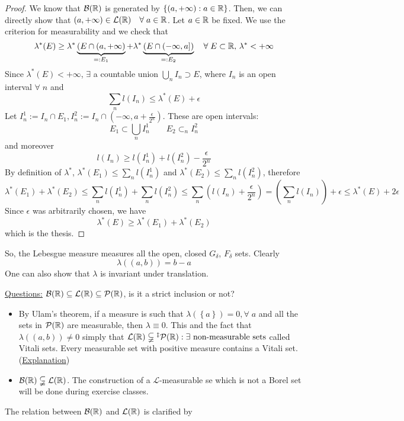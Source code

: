 \begin{proof}
    We know that \(\mathcal{B}(\mathbb{R})\) is generated by \(\left\lbrace (a, +\infty) : a \in \mathbb{R} \right\rbrace\). Then, we can directly show that \((a, +\infty) \in \mathcal{L}(\mathbb{R}) \quad \forall \; a \in \mathbb{R}\). Let \(a \in \mathbb{R}\) be fixed. We use the criterion for measurability and we check that 
    \[
        \lambda^* (E) \geq \lambda^*\underbrace{(E \cap (a, +\infty)}_{=: E_1} + \lambda^*\underbrace{(E \cap (-\infty, a])}_{=:E_2} \quad \forall\; E \subset \mathbb{R}, \, \lambda^* < +\infty
    \]
    Since \(\lambda^*(E) < +\infty\), \(\exists\) a countable union \(\bigcup_n I_n \supset E\), where \(I_n\) is an open interval \(\forall \; n\) and 
    \[
        \sum_n l(I_n) \leq \lambda^*(E) + \epsilon
    \]
    Let \(I^1_n := I_n \cap E_1, I^2_n := I_n \cap (-\infty, a + \frac{\epsilon}{2^n})\). These are open intervals:
    \[
        E_1 \subset \bigcup_n I^1_n \qquad E_2 \subset_n I^2_n
    \tag*{countable unions}\]
    and moreover 
    \[
        l(I_n) \geq l(I^1_n) + l(I^2_n) - \frac{\epsilon}{2^n}
    \]
    By definition of \(\lambda^*\), \(\lambda^*(E_1) \leq \sum_n l(I^1_n)\) and \(\lambda^* (E_2) \leq \sum_n l(I^2_n)\), therefore 
    \[
        \lambda^*(E_1) + \lambda^*(E_2) \leq \sum_n l(I^1_n) + \sum_n l(I^2_n) \leq \sum_n \left(l(I_n) +\frac{\epsilon}{2^n}\right) = \left(\sum_n l(I_n)\right) + \epsilon \leq \lambda^*(E) + 2\epsilon
    \]
    Since \(\epsilon\) was arbitrarily chosen, we have
    \[
        \lambda^*(E) \geq \lambda^*(E_1) + \lambda^*(E_2)
    \]  
    which is the thesis.
\end{proof}
So, the Lebesgue measure measures all the open, closed \(G_{\delta}\), \(F_{\delta}\) sets. Clearly
\[
    \lambda((a,b)) = b-a
\]
One can also show that \(\lambda\) is invariant under translation. 

\underline{Questions:} \(\mathcal{B}(\mathbb{R}) \subseteq \mathcal{L}(\mathbb{R}) \subseteq \mathcal{P}(\mathbb{R})\), is it a strict inclusion or not?
\begin{itemize}
    \item By Ulam's theorem, if a measure is such that \(\lambda \left(\left\{ a \right\}\right) = 0, \forall \; a\) and all the sets in \(\mathcal{P}(\mathbb{R})\) are measurable, then \(\lambda \equiv 0\). This and the fact that \(\lambda\left(\left(a,b\right)\right) \not = 0\) simply that \(\mathcal{L}(\real) \subsetneqq\symbolfootnotemark[3]{I had no choice} \mathcal{P}(\real) : \exists \mbox{ non-measurable sets}\) called Vitali sets. Every measurable set with positive measure contains a Vitali set. (\href{https://math.stackexchange.com/questions/137949/the-construction-of-a-vitali-set}{Explanation})
    \item \(\mathcal{B}(\mathbb{R}) \subsetneqq \mathcal{L}(\mathbb{R})\). The construction of a \(\mathcal{L}\)-measurable se which is not a Borel set will be done during exercise classes.
\end{itemize}
The relation between \(\mathcal{B}(\mathbb{R})\) and \(\mathcal{L}(\mathbb{R})\) is clarified by 

